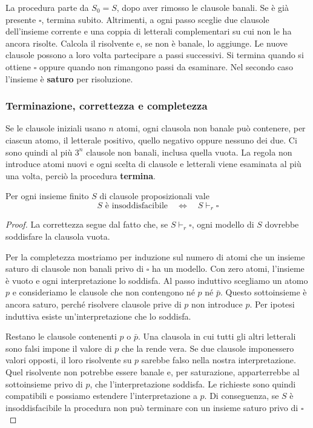 \medskip
\noindent
La procedura parte da $S_0=S$, dopo aver rimosso le clausole banali.
Se è già presente $\square$, termina subito. Altrimenti, a ogni
passo sceglie due clausole dell'insieme corrente e una coppia di
letterali complementari su cui non le ha ancora risolte. Calcola il
risolvente e, se non è banale, lo aggiunge. Le nuove clausole possono
a loro volta partecipare a passi successivi. Si termina quando si
ottiene $\square$ oppure quando non rimangono passi da esaminare.
Nel secondo caso l'insieme è \textbf{saturo} per risoluzione.

\subsubsection*{Terminazione, correttezza e completezza}
Se le clausole iniziali usano $n$ atomi, ogni clausola non banale
può contenere, per ciascun atomo, il letterale positivo, quello
negativo oppure nessuno dei due. Ci sono quindi al più $3^n$
clausole non banali, inclusa quella vuota. La regola non introduce
atomi nuovi e ogni scelta di clausole e letterali viene esaminata
al più una volta, perciò la procedura \textbf{termina}.

\medskip
\noindent
\colorbox{SALZO}{\parbox{\dimexpr\linewidth-2\fboxsep}{
\begin{theorem}
    Per ogni insieme finito $S$ di clausole proposizionali vale
    \[
        S\text{ è insoddisfacibile}
        \quad\Longleftrightarrow\quad
        S\vdash_r\square
    \]
\end{theorem}
}}%

\begin{proof}
    La correttezza segue dal fatto che, se $S\vdash_r\square$,
    ogni modello di $S$ dovrebbe soddisfare la clausola vuota.

    \noindent
    Per la completezza mostriamo per induzione sul numero di atomi
    che un insieme saturo di clausole non banali privo di $\square$
    ha un modello. Con zero atomi, l'insieme è vuoto e ogni
    interpretazione lo soddisfa. Al passo induttivo scegliamo un
    atomo $p$ e consideriamo le clausole che non contengono né $p$
    né $\bar p$. Questo sottoinsieme è ancora saturo, perché
    risolvere clausole prive di $p$ non introduce $p$. Per ipotesi
    induttiva esiste un'interpretazione che lo soddisfa.

    \noindent
    Restano le clausole contenenti $p$ o $\bar p$. Una clausola in
    cui tutti gli altri letterali sono falsi impone il valore di
    $p$ che la rende vera. Se due clausole imponessero valori
    opposti, il loro risolvente su $p$ sarebbe falso nella nostra
    interpretazione. Quel risolvente non potrebbe essere banale e,
    per saturazione, apparterrebbe al sottoinsieme privo di $p$,
    che l'interpretazione soddisfa. Le richieste sono quindi
    compatibili e possiamo estendere l'interpretazione a $p$.
    Di conseguenza, se $S$ è insoddisfacibile la procedura non può
    terminare con un insieme saturo privo di $\square$
\end{proof}

